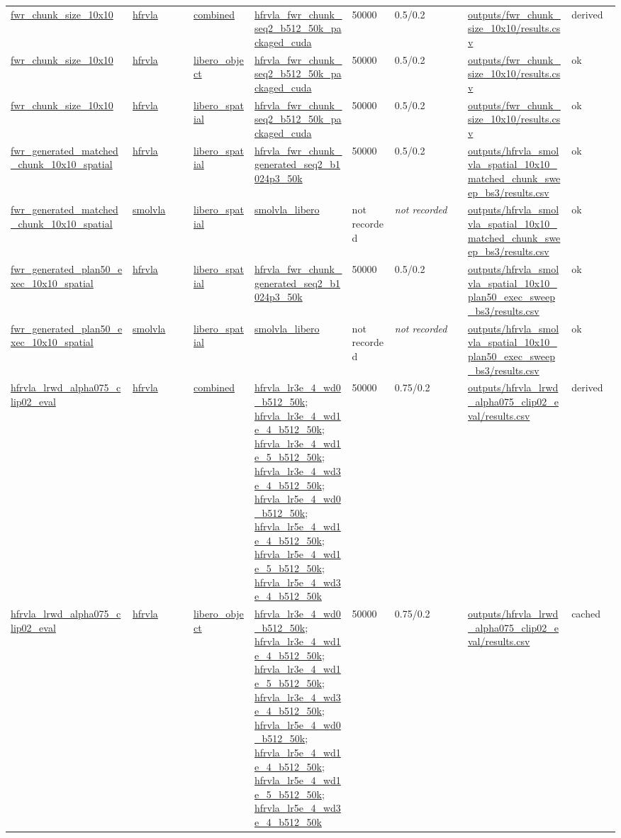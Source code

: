 \begin{scriptsize}
\begin{longtable}{@{}p{0.20\linewidth}p{0.10\linewidth}p{0.10\linewidth}p{0.16\linewidth}p{0.07\linewidth}p{0.12\linewidth}p{0.17\linewidth}p{0.08\linewidth}@{}}
\url{fwr_chunk_size_10x10} & \url{hfrvla} & \url{combined} & \url{hfrvla_fwr_chunk_seq2_b512_50k_packaged_cuda} & 50000 & 0.5/0.2 & \url{outputs/fwr_chunk_size_10x10/results.csv} & derived \\
\url{fwr_chunk_size_10x10} & \url{hfrvla} & \url{libero_object} & \url{hfrvla_fwr_chunk_seq2_b512_50k_packaged_cuda} & 50000 & 0.5/0.2 & \url{outputs/fwr_chunk_size_10x10/results.csv} & ok \\
\url{fwr_chunk_size_10x10} & \url{hfrvla} & \url{libero_spatial} & \url{hfrvla_fwr_chunk_seq2_b512_50k_packaged_cuda} & 50000 & 0.5/0.2 & \url{outputs/fwr_chunk_size_10x10/results.csv} & ok \\
\url{fwr_generated_matched_chunk_10x10_spatial} & \url{hfrvla} & \url{libero_spatial} & \url{hfrvla_fwr_chunk_generated_seq2_b1024p3_50k} & 50000 & 0.5/0.2 & \url{outputs/hfrvla_smolvla_spatial_10x10_matched_chunk_sweep_bs3/results.csv} & ok \\
\url{fwr_generated_matched_chunk_10x10_spatial} & \url{smolvla} & \url{libero_spatial} & \url{smolvla_libero} & not recorded & \emph{not recorded} & \url{outputs/hfrvla_smolvla_spatial_10x10_matched_chunk_sweep_bs3/results.csv} & ok \\
\url{fwr_generated_plan50_exec_10x10_spatial} & \url{hfrvla} & \url{libero_spatial} & \url{hfrvla_fwr_chunk_generated_seq2_b1024p3_50k} & 50000 & 0.5/0.2 & \url{outputs/hfrvla_smolvla_spatial_10x10_plan50_exec_sweep_bs3/results.csv} & ok \\
\url{fwr_generated_plan50_exec_10x10_spatial} & \url{smolvla} & \url{libero_spatial} & \url{smolvla_libero} & not recorded & \emph{not recorded} & \url{outputs/hfrvla_smolvla_spatial_10x10_plan50_exec_sweep_bs3/results.csv} & ok \\
\url{hfrvla_lrwd_alpha075_clip02_eval} & \url{hfrvla} & \url{combined} & \url{hfrvla_lr3e_4_wd0_b512_50k}; \url{hfrvla_lr3e_4_wd1e_4_b512_50k}; \url{hfrvla_lr3e_4_wd1e_5_b512_50k}; \url{hfrvla_lr3e_4_wd3e_4_b512_50k}; \url{hfrvla_lr5e_4_wd0_b512_50k}; \url{hfrvla_lr5e_4_wd1e_4_b512_50k}; \url{hfrvla_lr5e_4_wd1e_5_b512_50k}; \url{hfrvla_lr5e_4_wd3e_4_b512_50k} & 50000 & 0.75/0.2 & \url{outputs/hfrvla_lrwd_alpha075_clip02_eval/results.csv} & derived \\
\url{hfrvla_lrwd_alpha075_clip02_eval} & \url{hfrvla} & \url{libero_object} & \url{hfrvla_lr3e_4_wd0_b512_50k}; \url{hfrvla_lr3e_4_wd1e_4_b512_50k}; \url{hfrvla_lr3e_4_wd1e_5_b512_50k}; \url{hfrvla_lr3e_4_wd3e_4_b512_50k}; \url{hfrvla_lr5e_4_wd0_b512_50k}; \url{hfrvla_lr5e_4_wd1e_4_b512_50k}; \url{hfrvla_lr5e_4_wd1e_5_b512_50k}; \url{hfrvla_lr5e_4_wd3e_4_b512_50k} & 50000 & 0.75/0.2 & \url{outputs/hfrvla_lrwd_alpha075_clip02_eval/results.csv} & cached \\

\end{longtable}
\end{scriptsize}
